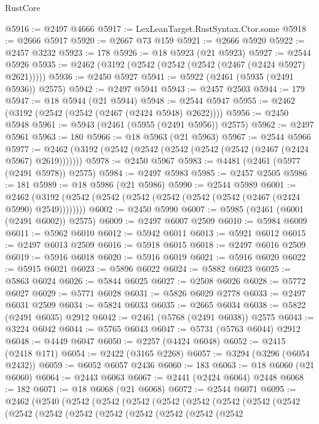 \begin{lexlean}{RustCore}
\begin{coremodule}
@5916 := @2497 @4666
@5917 := LexLeanTarget.RustSyntax.Ctor.some
@5918 := @2666 @5917
@5920 := @2667 @73 @159
@5921 := @2666 @5920
@5922 := @2457 @3232
@5923 := 178
@5926 := @18 @5923 (@21 @5923)
@5927 := @2544 @5926
@5935 := @2462 (@3192 (@2542 (@2542 (@2542 (@2467 (@2424 @5927) @2621)))))
@5936 := @2450 @5927
@5941 := @5922 (@2461 (@5935 (@2491 @5936)) @2575)
@5942 := @2497 @5941
@5943 := @2457 @2503
@5944 := 179
@5947 := @18 @5944 (@21 @5944)
@5948 := @2544 @5947
@5955 := @2462 (@3192 (@2542 (@2542 (@2467 (@2424 @5948) @2622))))
@5956 := @2450 @5948
@5961 := @5943 (@2461 (@5955 (@2491 @5956)) @2575)
@5962 := @2497 @5961
@5963 := 180
@5966 := @18 @5963 (@21 @5963)
@5967 := @2544 @5966
@5977 := @2462 (@3192 (@2542 (@2542 (@2542 (@2542 (@2542 (@2467 (@2424 @5967) @2619)))))))
@5978 := @2450 @5967
@5983 := @4481 (@2461 (@5977 (@2491 @5978)) @2575)
@5984 := @2497 @5983
@5985 := @2457 @2505
@5986 := 181
@5989 := @18 @5986 (@21 @5986)
@5990 := @2544 @5989
@6001 := @2462 (@3192 (@2542 (@2542 (@2542 (@2542 (@2542 (@2542 (@2467 (@2424 @5990) @2549))))))))
@6002 := @2450 @5990
@6007 := @5985 (@2461 (@6001 (@2491 @6002)) @2575)
@6009 := @2497 @6007 @2509
@6010 := @5984 @6009
@6011 := @5962 @6010
@6012 := @5942 @6011
@6013 := @5921 @6012
@6015 := @2497 @6013 @2509
@6016 := @5918 @6015
@6018 := @2497 @6016 @2509
@6019 := @5916 @6018
@6020 := @5916 @6019
@6021 := @5916 @6020
@6022 := @5915 @6021
@6023 := @5896 @6022
@6024 := @5882 @6023
@6025 := @5863 @6024
@6026 := @5844 @6025
@6027 := @2508 @6026
@6028 := @5772 @6027
@6029 := @5771 @6028
@6031 := @5826 @6029 @2778
@6033 := @2497 @6031 @2509
@6034 := @5824 @6033
@6035 := @2665 @6034
@6038 := @5822 (@2491 @6035) @2912
@6042 := @2461 (@5768 (@2491 @6038)) @2575
@6043 := @3224 @6042
@6044 := @5765 @6043
@6047 := @5731 (@5763 @6044) @2912
@6048 := @4449 @6047
@6050 := @2257 (@4424 @6048)
@6052 := @2415 (@2418 @171)
@6054 := @2422 (@3165 @2268)
@6057 := @3294 (@3296 (@6054 @2432))
@6059 := @6052 @6057 @2436
@6060 := 183
@6063 := @18 @6060 (@21 @6060)
@6064 := @2443 @6063
@6067 := @2441 (@2424 @6064) @2448
@6068 := 182
@6071 := @18 @6068 (@21 @6068)
@6072 := @2544 @6071
@6095 := @2462
    (@2540
      (@2542
        (@2542
          (@2542
            (@2542
              (@2542
                (@2542
                  (@2542
                    (@2542
                      (@2542
                        (@2542
                          (@2542
                            (@2542
                              (@2542
                                (@2542
                                  (@2542
                                    (@2542

\end{coremodule}
\end{lexlean}
